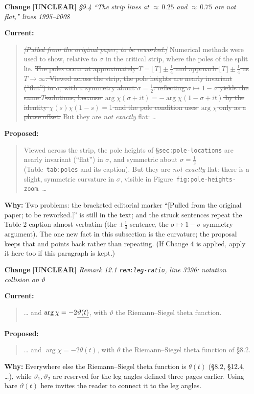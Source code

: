 \documentclass[11pt]{article}
\newcounter{chg}
\newcommand{\change}[3]{%
  \refstepcounter{chg}%
  \bigskip\par\noindent
  {\large\textbf{Change \thechg}}\quad
  {\color{#1}\textbf{[#2]}}\quad
  \textit{#3}\par\nobreak\smallskip}
\newenvironment{cur}{\par\noindent\textbf{Current:}\begin{quote}\color{delred}}{\end{quote}}
\newenvironment{prop}{\par\noindent\textbf{Proposed:}\begin{quote}\color{insblue}}{\end{quote}}
\newcommand{\why}[1]{\par\noindent\textbf{Why:} #1\par}
\begin{document}
\change{tagunc}{UNCLEAR}{\S{}9.4 ``The strip lines at ${\approx}\,0.25$ and
${\approx}\,0.75$ are not flat,'' lines 1995--2008}
\begin{cur}
\sout{\emph{[Pulled from the original paper; to be reworked.]}}
Numerical methods were used to show, relative to $\sigma$ in the critical
strip, where the poles of the split lie. \sout{The poles occur at approximately
$T=\lfloor T\rfloor\pm\tfrac14$ and approach $\lfloor T\rfloor\pm\tfrac14$ as
$T\to\infty$. Viewed across the strip, the pole heights are nearly invariant
(``flat'') in $\sigma$, with a symmetry about $\sigma=\tfrac12$: reflecting
$\sigma\mapsto1-\sigma$ yields the same $T$-solutions, because
$\arg\chi(\sigma+it)=-\arg\chi(1-\sigma+it)$ by the identity
$\chi(s)\chi(1-s)=1$ and the pole condition uses $\arg\chi$ only as a phase
offset.} But they are \emph{not exactly} flat: \ldots
\end{cur}
\begin{prop}
Viewed across the strip, the pole heights of \S\texttt{sec:pole-locations} are
nearly invariant (``flat'') in $\sigma$, and symmetric about $\sigma=\tfrac12$
(Table~\texttt{tab:poles} and its caption). But they are \emph{not exactly}
flat: there is a slight, symmetric curvature in $\sigma$, visible in
Figure~\texttt{fig:pole-heights-zoom}. \ldots
\end{prop}
\why{Two problems: the bracketed editorial marker ``[Pulled from the original
paper; to be reworked.]'' is still in the text; and the struck sentences repeat
the Table 2 caption almost verbatim (the $\pm\tfrac14$ sentence, the
$\sigma\mapsto1-\sigma$ symmetry argument). The one new fact in this subsection
is the curvature; the proposal keeps that and points back rather than
repeating. (If Change 4 is applied, apply it here too if this paragraph is
kept.)}

\change{tagunc}{UNCLEAR}{Remark 12.1 \texttt{rem:leg-ratio}, line 3396:
notation collision on $\vartheta$}
\begin{cur}
\ldots{} and $\arg\chi=-2\sout{\vartheta(t)}$, with
\sout{$\vartheta$} the Riemann--Siegel theta function.
\end{cur}
\begin{prop}
\ldots{} and $\arg\chi=-2\theta(t)$, with $\theta$ the Riemann--Siegel theta
function of \S{}8.2.
\end{prop}
\why{Everywhere else the Riemann--Siegel theta function is $\theta(t)$
(\S{}8.2, \S{}12.4, \ldots), while $\vartheta_1,\vartheta_2$ are reserved for
the leg angles defined three pages earlier. Using bare $\vartheta(t)$ here
invites the reader to connect it to the leg angles.}
\end{document}

